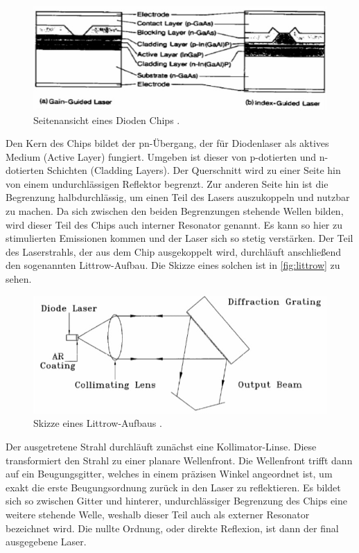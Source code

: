 \begin{figure}[H]
    \centering
    \includegraphics[width=\textwidth]{data/chip.jpg}
    \caption{Seitenansicht eines Dioden Chips \cite{Anleitung60}.}
    \label{fig:diodechip}
\end{figure}
\noindent
Den Kern des Chips bildet der pn-Übergang, der für Diodenlaser als aktives Medium (Active Layer) fungiert. Umgeben ist dieser von p-dotierten und n-dotierten Schichten
(Cladding Layers). Der Querschnitt wird zu einer Seite hin von einem undurchlässigen Reflektor begrenzt. Zur anderen Seite hin ist die Begrenzung halbdurchlässig, um
einen Teil des Lasers auszukoppeln und nutzbar zu machen. Da sich zwischen den beiden Begrenzungen stehende Wellen bilden, wird dieser Teil des Chips auch interner
Resonator genannt. Es kann so hier zu stimulierten Emissionen kommen und der Laser sich so stetig verstärken.
\newline
Der Teil des Laserstrahls, der aus dem Chip ausgekoppelt wird, durchläuft anschließend den sogenannten Littrow-Aufbau. Die Skizze eines solchen ist in
\autoref{fig:littrow} zu sehen.

\begin{figure}[H]
    \centering
    \includegraphics[width=\textwidth]{data/littrow.jpg}
    \caption{Skizze eines Littrow-Aufbaus \cite{Anleitung60}.}
    \label{fig:littrow}
\end{figure}
\noindent
Der ausgetretene Strahl durchläuft zunächst eine Kollimator-Linse. Diese transformiert den Strahl zu einer planare Wellenfront. Die Wellenfront trifft dann auf
ein Beugungsgitter, welches in einem präzisen Winkel angeordnet ist, um exakt die erste Beugungsordnung zurück in den Laser zu reflektieren. Es bildet sich so
zwischen Gitter und hinterer, undurchlässiger Begrenzung des Chips eine weitere stehende Welle, weshalb dieser Teil auch als externer Resonator bezeichnet wird.
Die nullte Ordnung, oder direkte Reflexion, ist dann der final ausgegebene Laser.


